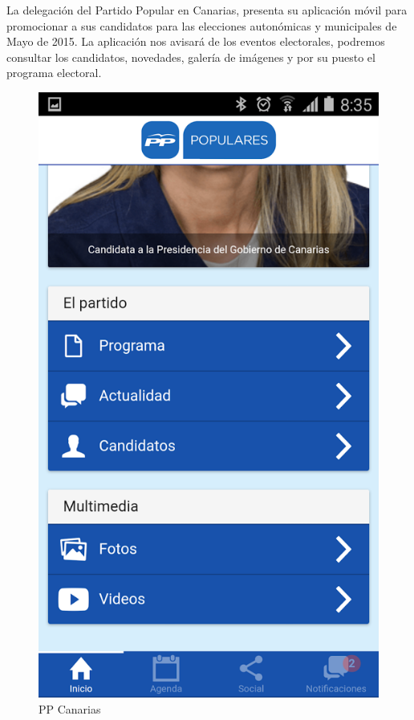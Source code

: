 La delegación del Partido Popular en Canarias, presenta su aplicación móvil para promocionar a sus candidatos para las elecciones autonómicas y municipales de Mayo de 2015. La aplicación nos avisará de los eventos electorales, podremos consultar los candidatos, novedades, galería de imágenes y por su puesto el programa electoral.

	\begin{figure}[H]
      \centering
	\includegraphics[keepaspectratio, scale=0.35]{Media/Captures/ppcanarias.png}
      \caption{PP Canarias}
      \label{fig:ppcanarias}
    \end{figure}

